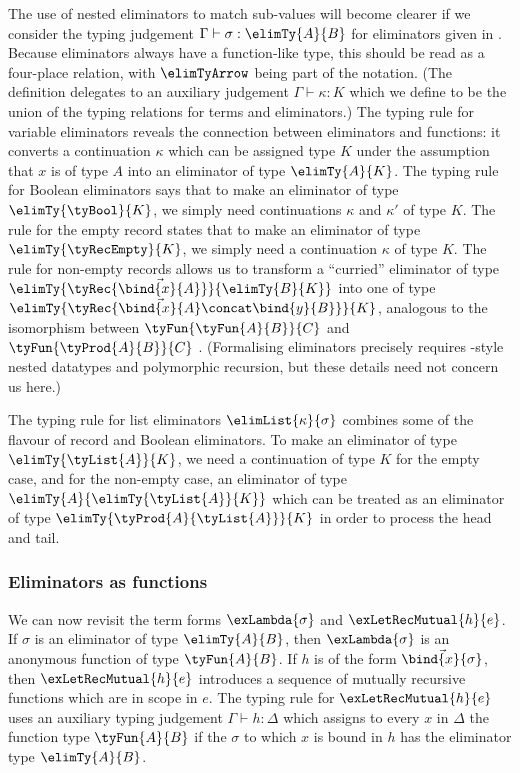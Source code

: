 

The use of nested eliminators to match sub-values will become clearer if we consider the typing judgement $\Gamma \vdash \sigma: \elimTy{A}{B}$ for eliminators given in . Because eliminators always have a function-like type, this should be read as a four-place relation, with $\elimTyArrow$ being part of the notation. (The definition delegates to an auxiliary judgement $\Gamma \vdash \kappa: K$ which we define to be the union of the typing relations for terms and eliminators.) The typing rule for variable eliminators reveals the connection between eliminators and functions: it converts a continuation $\kappa$ which can be assigned type $K$ under the assumption that $x$ is of type $A$ into an eliminator of type $\elimTy{A}{K}$. The typing rule for Boolean eliminators says that to make an eliminator of type $\elimTy{\tyBool}{K}$, we simply need continuations $\kappa$ and $\kappa'$ of type $K$. The rule for the empty record states that to make an eliminator of type $\elimTy{\tyRecEmpty}{K}$, we simply need a continuation $\kappa$ of type $K$. The rule for non-empty records allows us to transform a ``curried'' eliminator of type $\elimTy{\tyRec{\vec{\bind{x}{A}}}}{\elimTy{B}{K}}$ into one of type $\elimTy{\tyRec{\vec{\bind{x}{A}} \concat \bind{y}{B}}}{K}$, analogous to the isomorphism between $\tyFun{\tyFun{A}{B}}{C}$ and $\tyFun{\tyProd{A}{B}}{C}$ \cite{hinze00}. (Formalising eliminators precisely requires \citeauthor{bird98}-style nested datatypes \cite{bird98} and polymorphic recursion, but these details need not concern us here.)

The typing rule for list eliminators $\elimList{\kappa}{\sigma}$ combines some of the flavour of record and Boolean eliminators. To make an eliminator of type $\elimTy{\tyList{A}}{K}$, we need a continuation of type $K$ for the empty case, and for the non-empty case, an eliminator of type $\elimTy{A}{\elimTy{\tyList{A}}{K}}$ which can be treated as an eliminator of type $\elimTy{\tyProd{A}{\tyList{A}}}{K}$ in order to process the head and tail.

\subsubsection{Eliminators as functions}

We can now revisit the term forms $\exLambda{\sigma}$ and $\exLetRecMutual{h}{e}$. If $\sigma$ is an eliminator of type $\elimTy{A}{B}$, then $\exLambda{\sigma}$ is an anonymous function of type $\tyFun{A}{B}$. If $h$ is of the form $\vec{\bind{x}{\sigma}}$, then $\exLetRecMutual{h}{e}$ introduces a sequence of mutually recursive functions which are in scope in $e$. The typing rule for $\exLetRecMutual{h}{e}$ uses an auxiliary typing judgement $\Gamma \vdash h : \Delta$ which assigns to every $x$ in $\Delta$ the function type $\tyFun{A}{B}$ if the $\sigma$ to which $x$ is bound in $h$ has the eliminator type $\elimTy{A}{B}$.

